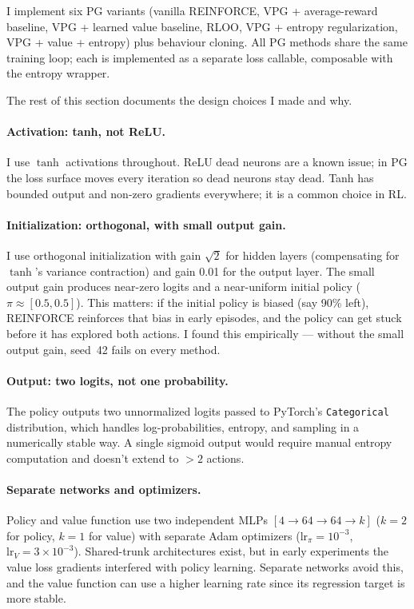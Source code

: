 \documentclass{article}
\begin{document}
I implement six PG variants (vanilla REINFORCE, VPG + average-reward baseline, VPG + learned value baseline, RLOO, VPG + entropy regularization, VPG + value + entropy) plus behaviour cloning.
All PG methods share the same training loop; each is implemented as a separate loss callable, composable with the entropy wrapper.

The rest of this section documents the design choices I made and why.

\paragraph{Activation: tanh, not ReLU.}
I use $\tanh$ activations throughout.
ReLU dead neurons are a known issue; in PG the loss surface moves every iteration so dead neurons stay dead.
Tanh has bounded output and non-zero gradients everywhere; it is a common choice in RL.

\paragraph{Initialization: orthogonal, with small output gain.}
I use orthogonal initialization with gain $\sqrt{2}$ for hidden layers (compensating for $\tanh$'s variance contraction) and gain 0.01 for the output layer.
The small output gain produces near-zero logits and a near-uniform initial policy ($\pi \approx [0.5, 0.5]$).
This matters: if the initial policy is biased (say 90\% left), REINFORCE reinforces that bias in early episodes, and the policy can get stuck before it has explored both actions.
I found this empirically --- without the small output gain, seed~42 fails on every method.

\paragraph{Output: two logits, not one probability.}
The policy outputs two unnormalized logits passed to PyTorch's \texttt{Categorical} distribution, which handles log-probabilities, entropy, and sampling in a numerically stable way.
A single sigmoid output would require manual entropy computation and doesn't extend to $>2$ actions.

\paragraph{Separate networks and optimizers.}
Policy and value function use two independent MLPs $[4 \to 64 \to 64 \to k]$ ($k{=}2$ for policy, $k{=}1$ for value) with separate Adam optimizers ($\text{lr}_\pi = 10^{-3}$, $\text{lr}_V = 3 \times 10^{-3}$).
Shared-trunk architectures exist, but in early experiments the value loss gradients interfered with policy learning.
Separate networks avoid this, and the value function can use a higher learning rate since its regression target is more stable.
\end{document}
